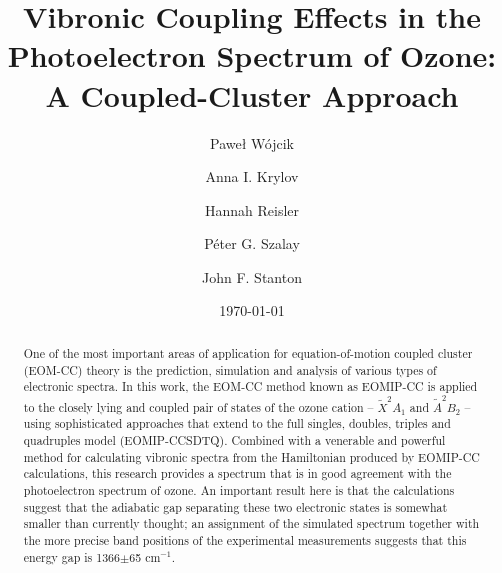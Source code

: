 \documentclass[
12pt,
a4paper,
prb,
superscriptaddress,
]{revtex4}
\begin{document}
\title{Vibronic Coupling Effects in the Photoelectron Spectrum of Ozone: A
Coupled-Cluster Approach}

\author{Pawe{\l} W{\'o}jcik}

\author{Anna I. Krylov}

\author{Hannah Reisler}

\author{P{\'e}ter G. Szalay}

\author{John F. Stanton}

\date{\today}

\begin{abstract}
One of the most important areas of application for equation-of-motion coupled
cluster (EOM-CC) theory is the prediction, simulation and analysis of
various types of electronic spectra.   In this work, the EOM-CC method known
as EOMIP-CC is applied to the closely lying and coupled pair of states of the
ozone cation -- ${\tilde X}^2A_1$ and ${\tilde A}^2B_2$ -- using sophisticated
approaches that extend to the full singles, doubles, triples and quadruples
model (EOMIP-CCSDTQ).   Combined with a venerable and powerful method for
calculating vibronic spectra from the Hamiltonian produced by EOMIP-CC
calculations, this research provides a spectrum that is in good agreement with
the photoelectron spectrum of ozone.   An important result here is that the
calculations suggest that the adiabatic gap separating these two electronic
states is somewhat smaller than currently thought; an assignment of the
simulated spectrum together with the more precise band positions of the
experimental measurements suggests that this energy gap is 1366$\pm$65
cm$^{-1}$.
\end{abstract}
\end{document}
